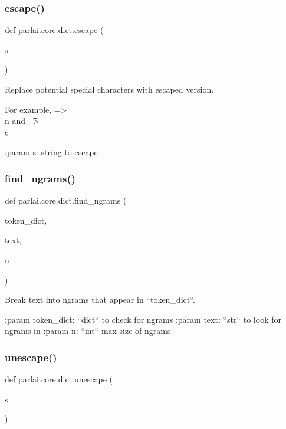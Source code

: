 \subsubsection{\texorpdfstring{escape()}{escape()}}
{\footnotesize\ttfamily def parlai.\+core.\+dict.\+escape (\begin{DoxyParamCaption}\item[{}]{s }\end{DoxyParamCaption})}

\begin{DoxyVerb}Replace potential special characters with escaped version.

For example, \n => \\n and \t => \\t

:param s:
    string to escape
\end{DoxyVerb}
 \mbox{\label{namespaceparlai_1_1core_1_1dict_a5e9eb43b6c0dce0b3aab7f3ea3717de6}} 
\subsubsection{\texorpdfstring{find\+\_\+ngrams()}{find\_ngrams()}}
{\footnotesize\ttfamily def parlai.\+core.\+dict.\+find\+\_\+ngrams (\begin{DoxyParamCaption}\item[{}]{token\+\_\+dict,  }\item[{}]{text,  }\item[{}]{n }\end{DoxyParamCaption})}

\begin{DoxyVerb}Break text into ngrams that appear in ``token_dict``.

:param token_dict:
    ``dict`` to check for ngrams
:param text:
    ``str`` to look for ngrams in
:param n:
    ``int`` max size of ngrams
\end{DoxyVerb}
 \mbox{\label{namespaceparlai_1_1core_1_1dict_a4d8952ff127b540967c707a58e8ebb48}} 
\subsubsection{\texorpdfstring{unescape()}{unescape()}}
{\footnotesize\ttfamily def parlai.\+core.\+dict.\+unescape (\begin{DoxyParamCaption}\item[{}]{s }\end{DoxyParamCaption})}

